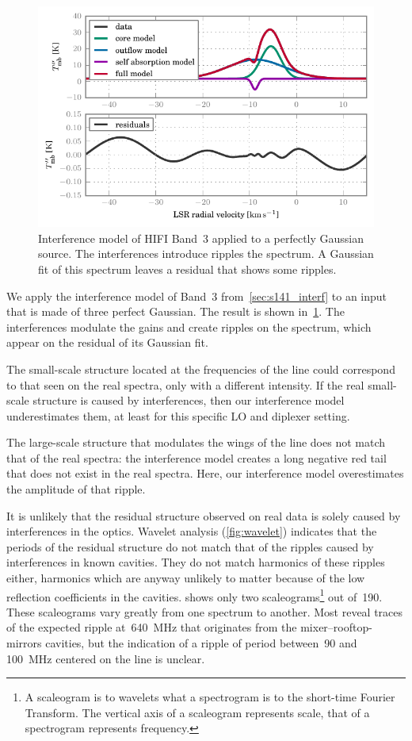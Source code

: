 \begin{figure}[b!]
    \centering
    \includegraphics{87_00_00_interf}
    \caption{
        Interference model of HIFI Band~3 applied to a perfectly Gaussian source.
        The interferences introduce ripples the spectrum.
        A Gaussian fit of this spectrum leaves a residual that shows some ripples.
    }
    \label{fig:87_00_00_interf}
\end{figure}

We apply the interference model of Band~3 from~\cref{sec:s141_interf} to an input that is made of three perfect Gaussian.
The result is shown in~\cref{fig:87_00_00_interf}.
The interferences modulate the gains and create ripples on the spectrum, which appear on the residual of its Gaussian fit.


The small-scale structure located at the frequencies of the line could correspond to that seen on the real spectra, only with a different intensity.
If the real small-scale structure is caused by interferences, then our interference model underestimates them, at least for this specific LO and diplexer setting.

The large-scale structure that modulates the wings of the line does not match that of the real spectra: the interference model creates a long negative red tail that does not exist in the real spectra.
Here, our interference model overestimates the amplitude of that ripple.

It is unlikely that the residual structure observed on real data is solely caused by interferences in the optics.
Wavelet analysis (\cref{fig:wavelet}) indicates that the periods of the residual structure do not match that of the ripples caused by interferences in known cavities.
They do not match harmonics of these ripples either, harmonics which are anyway unlikely to matter because of the low reflection coefficients in the cavities.
 shows only two scaleograms\footnote{A scaleogram is to wavelets what a spectrogram is to the short-time Fourier Transform.  The vertical axis of a scaleogram represents scale, that of a spectrogram represents frequency.} out of~190.
These scaleograms vary greatly from one spectrum to another.
Most reveal traces of the expected ripple at~\SI{640}{\mega\hertz} that originates from the mixer--rooftop-mirrors cavities, but the indication of a ripple of period between~\num{90} and \SI{100}{\mega\hertz} centered on the line is unclear.

